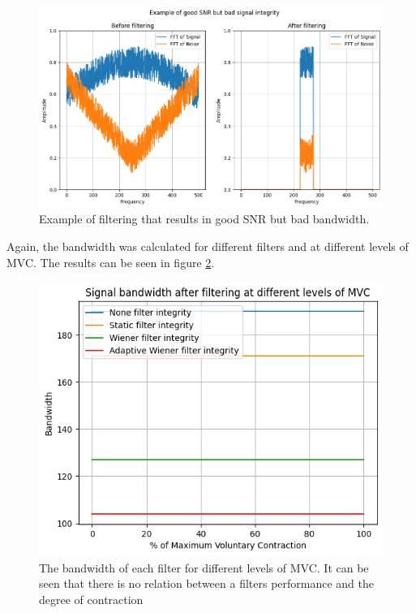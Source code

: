 \begin{figure}[h!t]
	\begin{center}
		\includegraphics[width=1.0\columnwidth]{images/good_snr_bad_integrity.png}
	\end{center}
	\caption{Example of filtering that results in good SNR but bad bandwidth.}
	\label{fig:good_snr_bad_integrity}
\end{figure}

Again, the bandwidth was calculated for different filters and at different levels of MVC. The results can be seen in figure \ref{fig:filter_bw_mvc}.

\begin{figure}[h!t]
	\begin{center}
		\includegraphics[width=0.7\columnwidth]{images/filter_bw_mvc.png}
	\end{center}
	\caption{The bandwidth of each filter for different levels of MVC. It can be seen that there is no relation between a filters performance and the degree of contraction}
	\label{fig:filter_bw_mvc}
\end{figure}

